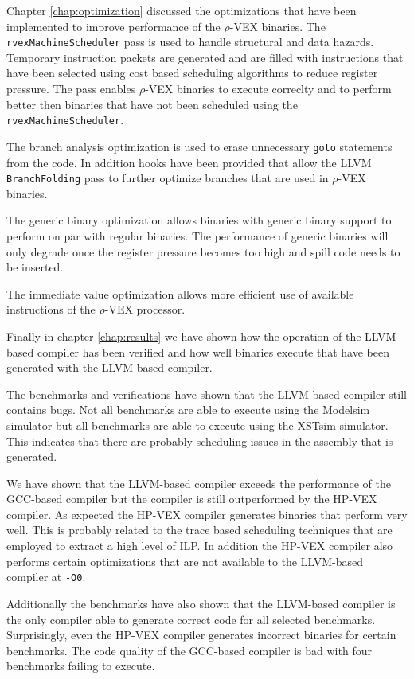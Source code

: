 Chapter \ref{chap:optimization} discussed the optimizations that have been implemented to improve performance of the $\rho$-VEX binaries. The \texttt{rvexMachineScheduler} pass is used to handle structural and data hazards. Temporary instruction packets are generated and are filled with instructions that have been selected using cost based scheduling algorithms to reduce register pressure. The pass enables $\rho$-VEX binaries to execute correclty and to perform better then binaries that have not been scheduled using the \texttt{rvexMachineScheduler}.

The branch analysis optimization is used to erase unnecessary \texttt{goto} statements from the code. In addition hooks have been provided that allow the LLVM \texttt{BranchFolding} pass to further optimize branches that are used in $\rho$-VEX binaries.

The generic binary optimization allows binaries with generic binary support to perform on par with regular binaries. The performance of generic binaries will only degrade once the register pressure becomes too high and spill code needs to be inserted.

The immediate value optimization allows more efficient use of available instructions of the  $\rho$-VEX processor.

Finally in chapter \ref{chap:results} we have shown how the operation of the LLVM-based compiler has been verified and how well binaries execute that have been generated with the LLVM-based compiler.

The benchmarks and verifications have shown that the LLVM-based compiler still contains bugs. Not all benchmarks are able to execute using the Modelsim simulator but all benchmarks are able to execute using the XSTsim simulator. This indicates that there are probably scheduling issues in the assembly that is generated.

We have shown that the LLVM-based compiler exceeds the performance of the GCC-based compiler but the compiler is still outperformed by the HP-VEX compiler. As expected the HP-VEX compiler generates binaries that perform very well. This is probably related to the trace based scheduling techniques that are employed to extract a high level of ILP. In addition the HP-VEX compiler also performs certain optimizations that are not available to the LLVM-based compiler at \texttt{-O0}.

Additionally the benchmarks have also shown that the LLVM-based compiler is the only compiler able to generate correct code for all selected benchmarks. Surprisingly, even the HP-VEX compiler generates incorrect binaries for certain benchmarks. The code quality of the GCC-based compiler is bad with four benchmarks failing to execute.

